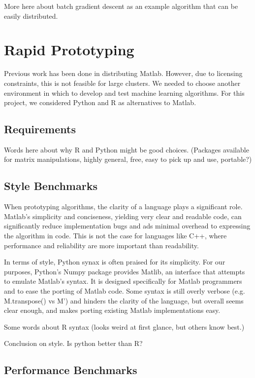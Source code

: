 \documentclass[%
        final,
        notitlepage,
        narroweqnarray,
        inline,
        ]{ieee}
\begin{document}
More here about batch gradient descent as an example algorithm that can be
easily distributed.

\section{Rapid Prototyping}

Previous work has been done in distributing Matlab. However, due to licensing
constraints, this is not feasible for large clusters. We needed to choose
another environment in which to develop and test machine learning
algorithms. For this project, we considered Python and R as alternatives to
Matlab.

\subsection{Requirements}

Words here about why R and Python might be good choices. (Packages available
for matrix manipulations, highly general, free, easy to pick up and use,
portable?)


\subsection{Style Benchmarks}

When prototyping algorithms, the clarity of a language plays a significant role.  Matlab's simplicity and conciseness, yielding very clear and readable code, can significantly reduce implementation bugs and ads minimal overhead to expressing the algorithm in code. This is not the case for languages like C++, where performance and reliability are more important than readability.

In terms of style, Python synax is often praised for its simplicity. For our purposes, Python's Numpy package provides Matlib, an interface that attempts to emulate Matlab's syntax. It is designed  specifically for Matlab programmers and to ease the porting of Matlab code. Some syntax is still overly verbose (e.g. M.transpose() vs M') and hinders the clarity of the language, but overall seems clear enough, and makes porting existing Matlab implementations easy.

Some words about R syntax (looks weird at first glance, but others know best.)

Conclusion on style. Is python better than R?

\subsection{Performance Benchmarks}
\end{document}
